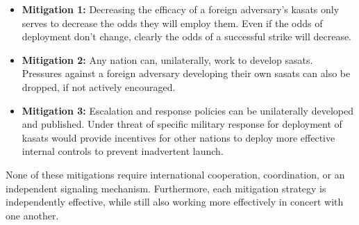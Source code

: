 \begin{itemize}

\item {\bfseries Mitigation 1:} Decreasing the efficacy of a foreign
  adversary's \acp{kasat} only serves to decrease the odds they will
  employ them.  Even if the odds of deployment don't change, clearly
  the odds of a successful strike will decrease.

\item {\bfseries Mitigation 2:} Any nation can, unilaterally, work to
  develop \acp{sasat}.  Pressures against a foreign adversary
  developing their own \acp{sasat} can also be dropped, if not
  actively encouraged.

\item {\bfseries Mitigation 3:} Escalation and response policies can
  be unilaterally developed and published.  Under threat of specific
  military response for deployment of \acp{kasat} would provide
  incentives for other nations to deploy more effective internal
  controls to prevent inadvertent launch.

\end{itemize}

None of these mitigations require international cooperation,
coordination, or an independent signaling mechanism.  Furthermore,
each mitigation strategy is independently effective, while still also
working more effectively in concert with one another.
